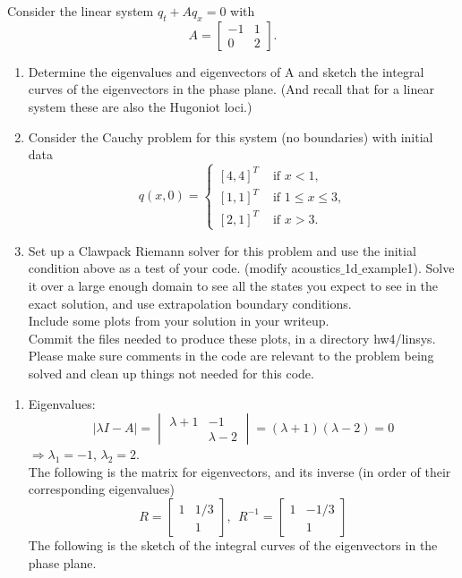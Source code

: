 \documentclass[11pt]{article}
\begin{document}
\begin{enumerate}
		Consider the linear system $q_t+Aq_x=0$ with
		\[
		A=\begin{bmatrix}-1&1\\0&2\end{bmatrix}.
		\]
		\begin{enumerate}
			\item
				Determine the eigenvalues and eigenvectors of A and sketch the integral curves of the eigenvectors in the phase plane. (And recall that for a linear system these are also the Hugoniot loci.)
			\item
				Consider the Cauchy problem for this system (no boundaries) with initial data
				\[
				q(x,0)=\begin{cases}[4,4]^T &\text{ if } x<1,\\
				[1,1]^T &\text{ if }1\leq x \leq 3,\\
				[2,1]^T &\text{ if }x>3.\end{cases}
				\]
			\item
				Set up a Clawpack Riemann solver for this problem and use the initial condition above as a test of your code. (modify \textsf{acoustics$\_$1d$\_$example1}). Solve it over a large enough domain to see all the states you expect to see in the exact solution, and use extrapolation boundary conditions.\\
				Include some plots from your solution in your writeup.\\
				Commit the files needed to produce these plots, in a directory \textsf{hw4/linsys}.\\
				Please make sure comments in the code are relevant to the problem being solved and clean up things not needed for this code.
		\end{enumerate}
		
		
		\vskip 5pt
        \vskip 5pt
        
        \begin{enumerate}
        	\item
        		Eigenvalues:
        		\[
        		|\lambda I-A|=\begin{vmatrix}\lambda+1 &-1 \\ &\lambda -2\end{vmatrix}=
        		(\lambda+1)(\lambda-2)=0
        		\]
        		$\Rightarrow \lambda_1=-1$, $\lambda_2=2$.\\
        		
        		The following is the matrix for eigenvectors, and its inverse (in order of their corresponding eigenvalues)
        		\[
        		R=\begin{bmatrix}1&1/3\\&1\end{bmatrix}, \ \
        		R^{-1}=\begin{bmatrix}1&-1/3\\&1\end{bmatrix}
        		\]
        		The following is the sketch of the integral curves of the eigenvectors in the phase plane.
        							

\end{enumerate}
\end{enumerate}
\end{document}
